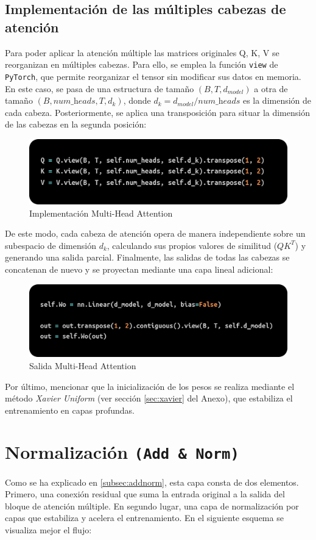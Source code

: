 \documentclass[11pt]{book}
\theoremstyle{plain}
\theoremstyle{definition}
\begin{document}
\subsection{Implementación de las múltiples cabezas de atención}
Para poder aplicar la atención múltiple las matrices originales Q, K, V se reorganizan en múltiples cabezas. Para ello, se emplea la función \texttt{view} de \texttt{PyTorch}, que permite reorganizar el tensor sin modificar sus datos en memoria. En este caso, se pasa de una estructura de tamaño $(B, T, d_{model})$ a otra de tamaño $(B, \textit{num\_heads}, T, d_k)$, donde $d_k = d_{model} / \textit{num\_heads}$ es la dimensión de cada cabeza. Posteriormente, se aplica una transposición para situar la dimensión de las cabezas en la segunda posición:

\begin{figure}[h]
    \centering
    \includegraphics[width=0.5\linewidth]{img/heads.png}
    \caption{Implementación Multi-Head Attention}
    \label{fig:placeholder11}
\end{figure}

De este modo, cada cabeza de atención opera de manera independiente sobre un subespacio de dimensión $d_k$, calculando sus propios valores de similitud ($QK^T$) y generando una salida parcial. Finalmente, las salidas de todas las cabezas se concatenan de nuevo y se proyectan mediante una capa lineal adicional:

\begin{figure}[h]
    \centering
    \includegraphics[width=0.5\linewidth]{img/heads2.png}
    \caption{Salida Multi-Head Attention}
    \label{fig:placeholder12}
\end{figure}

Por último, mencionar que la inicialización de los pesos se realiza mediante el método \textit{Xavier Uniform} (ver sección \ref{sec:xavier} del Anexo), que estabiliza el entrenamiento en capas profundas. 

\section{Normalización \texttt{(Add \& Norm)}}
Como se ha explicado en \ref{subsec:addnorm}, esta capa consta de dos elementos. Primero, una conexión residual que suma la entrada original a la salida del bloque de atención múltiple. En segundo lugar, una capa de normalización por capas que estabiliza y acelera el entrenamiento. En el siguiente esquema se visualiza mejor el flujo: 
\end{document}
